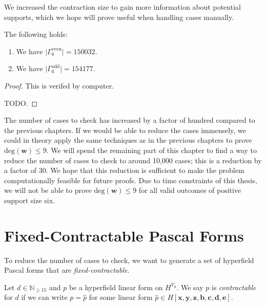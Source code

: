 We increased the contraction size to gain more information about potential supports, which we hope will prove useful when handling cases manually.

\begin{proposition}
    The following holds:
    \begin{enumerate}
        \item We have \( \lvert \Gamma^{\mathrm{even}}_6 \rvert  = 150032\).
        \item We have \( \lvert \Gamma^{\mathrm{odd}}_6 \rvert  = 154177\).
    \end{enumerate}
\end{proposition}

\begin{proof}
    This is verifed by computer. 
    
    TODO. 
\end{proof}

The number of cases to check has increased by a factor of hundred compared to the previous chapters. If we would be able to reduce the cases immensely, we could in theory apply the same techniques as in the previous chapters to prove \( \mathrm{deg}(\mathbf w) \leq 9 \). We will spend the remaining part of this chapter to find a way to reduce the number of cases to check to around 10,000 cases; this is a reduction by a factor of 30. We hope that this reduction is sufficient to make the problem computationally feasible for future proofs. Due to time constraints of this thesis, we will not be able to prove \( \mathrm{deg}(\mathbf w) \leq 9 \) for all valid outcomes of positive support size six.

\section{Fixed-Contractable Pascal Forms}

To reduce the number of cases to check, we want to generate a set of hyperfield Pascal forms that are \emph{fixed-contractable}.

\begin{definition}
    Let \( d \in \mathbb{N}_{\geq 15} \) and \( p \) be a hyperfield linear form on \( H^{V_d} \). We say \( p \) is \emph{contractable} for \( d \) if we can write \( p = \hat p \) for some linear form \( \hat p \in H[\mathbf{x}, \mathbf{y}, \mathbf{z}, \mathbf{b}, \mathbf{c}, \mathbf{d}, \mathbf{e}] \). 
\end{definition}

